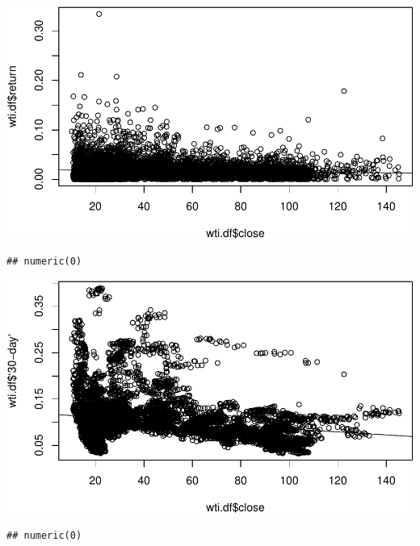 \documentclass[11pt,]{article}
\makeatletter
\newenvironment{Shaded}{\begin{snugshade}}{\end{snugshade}}
\newcommand{\KeywordTok}[1]{\textcolor[rgb]{0.13,0.29,0.53}{\textbf{{#1}}}}
\newcommand{\DataTypeTok}[1]{\textcolor[rgb]{0.13,0.29,0.53}{{#1}}}
\newcommand{\StringTok}[1]{\textcolor[rgb]{0.31,0.60,0.02}{{#1}}}
\newcommand{\NormalTok}[1]{{#1}}
\def\maxwidth{\ifdim\Gin@nat@width>\linewidth\linewidth
\else\Gin@nat@width\fi}
\let\Oldincludegraphics\includegraphics
\renewcommand{\includegraphics}[1]{\Oldincludegraphics[width=\maxwidth]{#1}}
\makeatother
\begin{document}
\includegraphics{JHamski_manuscript_files/figure-latex/unnamed-chunk-9-1.pdf}

\begin{verbatim}
## numeric(0)
\end{verbatim}

\begin{Shaded}
\end{Shaded}

\includegraphics{JHamski_manuscript_files/figure-latex/unnamed-chunk-9-2.pdf}

\begin{verbatim}
## numeric(0)
\end{verbatim}

\begin{Shaded}
\end{Shaded}
\end{document}

